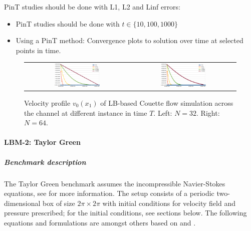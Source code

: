 PinT studies should be done with L1, L2 and Linf errors:
\begin{itemize}
	\item PinT studies should be done with $t \in \{ 10, 100, 1000 \}$
	\item Using a PinT method: Convergence plots to solution over time at selected points in time.
\end{itemize}

\begin{figure}[t!]
\begin{tabular}{c c}
\includegraphics[width=0.45\textwidth]{lattice_boltzmann_and_navier_stokes_images/32x32_couette_v0.png} & \includegraphics[width=0.45\textwidth]{lattice_boltzmann_and_navier_stokes_images/64x64_couette_v0.png}
\end{tabular}
\caption{Velocity profile $v_0(x_1)$ of LB-based Couette flow simulation across the channel at different instance in time $T$. Left: $N=32$. Right: $N=64$.}
\end{figure}


\paragraph{LBM-2: Taylor Green}



\subparagraph{Benchmark description}

The Taylor Green benchmark assumes the incompressible Navier-Stokes equations, see \cite{taylor1937mechanism} for more information.
The setup consists of a periodic two-dimensional box of size $2\pi \times 2\pi$ with initial conditions for velocity field and pressure prescribed; for the initial conditions, see sections below.
The following equations and formulations are amongst others based on \cite{wikiTaylorGreen} and \cite{taylor1937mechanism}.


